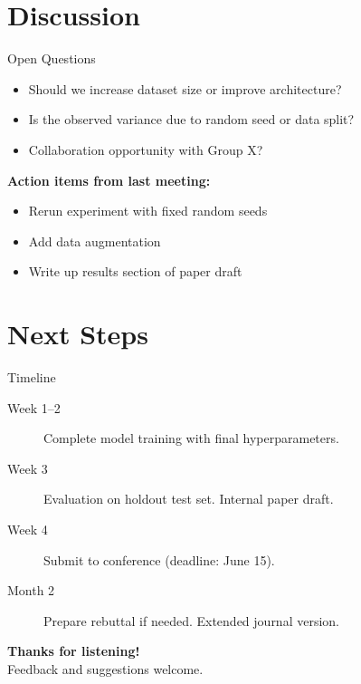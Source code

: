 \documentclass[aspectratio=169]{beamer}
\begin{document}
\section{Discussion}

\begin{frame}{Open Questions}
  \begin{itemize}
    \item Should we increase dataset size or improve architecture?
    \item Is the observed variance due to random seed or data split?
    \item Collaboration opportunity with Group X?
  \end{itemize}

  \vspace{1em}
  \textbf{Action items from last meeting:}
  \begin{itemize}
    \item[\checkmark] Rerun experiment with fixed random seeds
    \item[\checkmark] Add data augmentation
    \item[$\square$] Write up results section of paper draft
  \end{itemize}
\end{frame}

\section{Next Steps}

\begin{frame}{Timeline}
  \begin{description}
    \item[Week 1--2] Complete model training with final hyperparameters.
    \item[Week 3]    Evaluation on holdout test set. Internal paper draft.
    \item[Week 4]    Submit to conference (deadline: June 15).
    \item[Month 2]   Prepare rebuttal if needed. Extended journal version.
  \end{description}
\end{frame}

\begin{frame}[plain]
  \centering
  \vfill
  {\Large\bfseries Thanks for listening!}\\[1em]
  {\normalsize Feedback and suggestions welcome.}
  \vfill
\end{frame}
\end{document}
